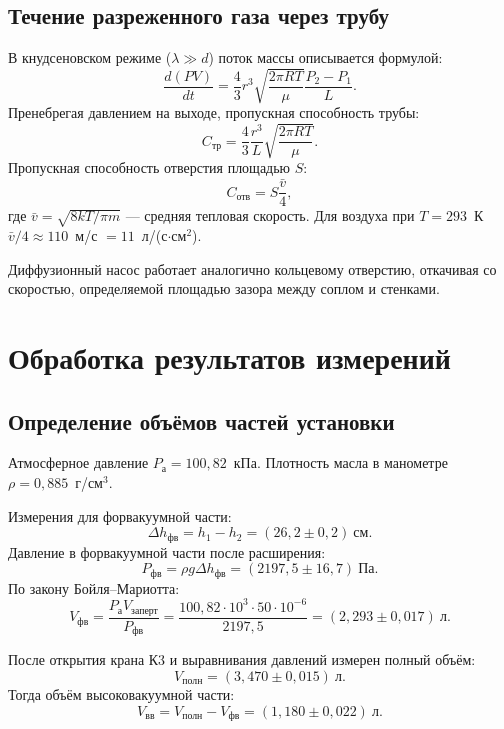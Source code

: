 \documentclass[12pt,a4paper]{article}
\begin{document}
\subsection{Течение разреженного газа через трубу}
В кнудсеновском режиме ($\lambda \gg d$) поток массы описывается формулой:
\begin{equation}
    \frac{d(PV)}{dt} = \frac{4}{3}r^3 \sqrt{\frac{2\pi RT}{\mu}} \frac{P_2 - P_1}{L}.
\end{equation}
Пренебрегая давлением на выходе, пропускная способность трубы:
\begin{equation}
    C_{\text{тр}} = \frac{4}{3} \frac{r^3}{L} \sqrt{\frac{2\pi RT}{\mu}}.
\end{equation}
Пропускная способность отверстия площадью $S$:
\begin{equation}
    C_{\text{отв}} = S \frac{\bar{v}}{4},
\end{equation}
где $\bar{v} = \sqrt{8kT/\pi m}$ — средняя тепловая скорость. Для воздуха при $T=293$\ К $\bar{v}/4 \approx 110$\ м/с $= 11$\ л/(с$\cdot$см$^2$).

Диффузионный насос работает аналогично кольцевому отверстию, откачивая со скоростью, определяемой площадью зазора между соплом и стенками.

\section{Обработка результатов измерений}

\subsection{Определение объёмов частей установки}
Атмосферное давление $P_{\text{а}} = 100,82$\ кПа. Плотность масла в манометре $\rho = 0,885$\ г/см$^3$.

Измерения для форвакуумной части:
\[
\Delta h_{\text{фв}} = h_1 - h_2 = (26,2 \pm 0,2)\ \text{см}.
\]
Давление в форвакуумной части после расширения:
\[
P_{\text{фв}} = \rho g \Delta h_{\text{фв}} = (2197,5 \pm 16,7)\ \text{Па}.
\]
По закону Бойля–Мариотта:
\[
V_{\text{фв}} = \frac{P_{\text{а}} V_{\text{заперт}}}{P_{\text{фв}}} = \frac{100,82 \cdot 10^3 \cdot 50 \cdot 10^{-6}}{2197,5} = (2,293 \pm 0,017)\ \text{л}.
\]

После открытия крана К3 и выравнивания давлений измерен полный объём:
\[
V_{\text{полн}} = (3,470 \pm 0,015)\ \text{л}.
\]
Тогда объём высоковакуумной части:
\[
V_{\text{вв}} = V_{\text{полн}} - V_{\text{фв}} = (1,180 \pm 0,022)\ \text{л}.
\]
\end{document}
